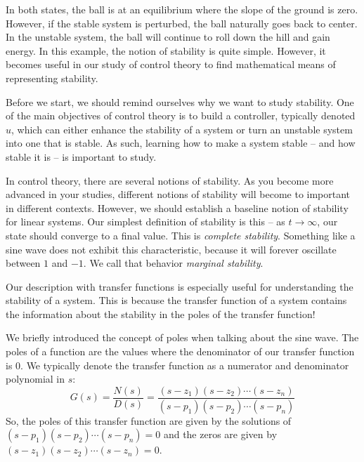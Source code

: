 In both states, the ball is at an equilibrium where the slope of the ground is zero. However, if the stable system is perturbed, the ball naturally goes back to center. In the unstable system, the ball will continue to roll down the hill and gain energy. In this example, the notion of stability is quite simple. However, it becomes useful in our study of control theory to find mathematical means of representing stability.

Before we start, we should remind ourselves why we want to study stability. One of the main objectives of control theory is to build a controller, typically denoted $u$, which can either enhance the stability of a system or turn an unstable system into one that is stable. As such, learning how to make a system stable -- and how stable it is -- is important to study.

In control theory, there are several notions of stability. As you become more advanced in your studies, different notions of stability will become to important in different contexts. However, we should establish a baseline notion of stability for linear systems. Our simplest definition of stability is this -- as $t\rightarrow\infty$, our state should converge to a final value. This is \textit{complete stability}. Something like a sine wave does not exhibit this characteristic, because it will forever oscillate between $1$ and $-1$. We call that behavior \textit{marginal stability}.

Our description with transfer functions is especially useful for understanding the stability of a system. This is because the transfer function of a system contains the information about the stability in the poles of the transfer function!

We briefly introduced the concept of poles when talking about the sine wave. The poles of a function are the values where the denominator of our transfer function is $0$. We typically denote the transfer function as a numerator and denominator polynomial in $s$:
$$G(s)=\frac{N(s)}{D(s)}=\frac{(s-z_1)(s-z_2)\cdots(s-z_n)}{(s-p_1)(s-p_2)\cdots(s-p_n)}$$
So, the poles of this transfer function are given by the solutions of $(s-p_1)(s-p_2)\cdots(s-p_n)=0$ and the zeros are given by $(s-z_1)(s-z_2)\cdots(s-z_n)=0$.

